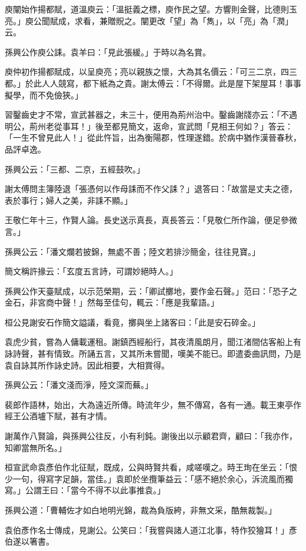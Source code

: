 庾闡始作揚都賦，道溫庾云：「溫挺義之標，庾作民之望。方響則金聲，比德則玉亮。」庾公聞賦成，求看，兼贈貺之。闡更改「望」為「雋」，以「亮」為「潤」云。

孫興公作庾公誄。袁羊曰：「見此張緩。」于時以為名賞。

庾仲初作揚都賦成，以呈庾亮；亮以親族之懷，大為其名價云：「可三二京，四三都。」於此人人競寫，都下紙為之貴。謝太傅云：「不得爾。此是屋下架屋耳！事事擬學，而不免儉狹。」

習鑿齒史才不常，宣武甚器之，未三十，便用為荊州治中。鑿齒謝牋亦云：「不遇明公，荊州老從事耳！」後至都見簡文，返命，宣武問「見相王何如？」答云：「一生不曾見此人！」從此忤旨，出為衡陽郡，性理遂錯。於病中猶作漢晉春秋，品評卓逸。

孫興公云：「三都、二京，五經鼓吹。」

謝太傅問主簿陸退「張憑何以作母誄而不作父誄？」退答曰：「故當是丈夫之德，表於事行；婦人之美，非誄不顯。」

王敬仁年十三，作賢人論。長史送示真長，真長答云：「見敬仁所作論，便足參微言。」

孫興公云：「潘文爛若披錦，無處不善；陸文若排沙簡金，往往見寶。」

簡文稱許掾云：「玄度五言詩，可謂妙絕時人。」

孫興公作天臺賦成，以示范榮期，云：「卿試擲地，要作金石聲。」范曰：「恐子之金石，非宮商中聲！」然每至佳句，輒云：「應是我輩語。」

桓公見謝安石作簡文謚議，看竟，擲與坐上諸客曰：「此是安石碎金。」

袁虎少貧，嘗為人傭載運租。謝鎮西經船行，其夜清風朗月，聞江渚間估客船上有詠詩聲，甚有情致。所誦五言，又其所未嘗聞，嘆美不能已。即遣委曲訊問，乃是袁自詠其所作詠史詩。因此相要，大相賞得。

孫興公云：「潘文淺而淨，陸文深而蕪。」

裴郎作語林，始出，大為遠近所傳。時流年少，無不傳寫，各有一通。載王東亭作經王公酒壚下賦，甚有才情。

謝萬作八賢論，與孫興公往反，小有利鈍。謝後出以示顧君齊，顧曰：「我亦作，知卿當無所名。」

桓宣武命袁彥伯作北征賦，既成，公與時賢共看，咸嗟嘆之。時王珣在坐云：「恨少一句，得寫字足韻，當佳。」袁即於坐攬筆益云：「感不絕於余心，泝流風而獨寫。」公謂王曰：「當今不得不以此事推袁。」

孫興公道：「曹輔佐才如白地明光錦，裁為負版絝，非無文采，酷無裁製。」

袁伯彥作名士傳成，見謝公。公笑曰：「我嘗與諸人道江北事，特作狡獪耳！」彥伯遂以箸書。

